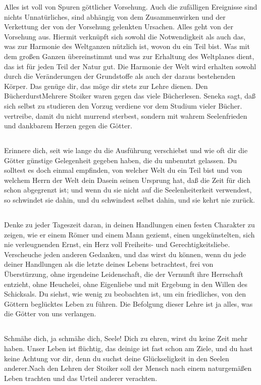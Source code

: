 \documentclass[12pt,ngerman,parskip=full]{scrartcl}
\newcounter{abschnitt}
\newcommand{\abschnitt}{\subsection*{\theabschnitt}\stepcounter{abschnitt}}
\begin{document}
Alles ist voll von Spuren göttlicher Vorsehung. Auch die zufälligen Ereignisse sind nichts Unnatürliches, sind abhängig von dem Zusammenwirken und der Verkettung der von der Vorsehung gelenkten Ursachen. Alles geht von der Vorsehung aus. Hiermit verknüpft sich sowohl die Notwendigkeit als auch das, was zur Harmonie des Weltganzen nützlich ist, wovon du ein Teil bist. Was mit dem großen Ganzen übereinstimmt und was zur Erhaltung des Weltplanes dient, das ist für jeden Teil der Natur gut. Die Harmonie der Welt wird erhalten sowohl durch die Veränderungen der Grundstoffe als auch der daraus bestehenden Körper. Das genüge dir, das möge dir stets zur Lehre dienen. Den BücherdurstMehrere Stoiker waren gegen das viele Bücherlesen. Seneka sagt, daß sich selbst zu studieren den Vorzug verdiene vor dem Studium vieler Bücher. vertreibe, damit du nicht murrend sterbest, sondern mit wahrem Seelenfrieden und dankbarem Herzen gegen die Götter.

\abschnitt

Erinnere dich, seit wie lange du die Ausführung verschiebst und wie oft dir die Götter günstige Gelegenheit gegeben haben, die du unbenutzt gelassen. Du solltest es doch einmal empfinden, von welcher Welt du ein Teil bist und von welchem Herrn der Welt dein Dasein seinen Ursprung hat, daß die Zeit für dich schon abgegrenzt ist; und wenn du sie nicht auf die Seelenheiterkeit verwendest, so schwindet sie dahin, und du schwindest selbst dahin, und sie kehrt nie zurück.

\abschnitt

Denke zu jeder Tageszeit daran, in deinen Handlungen einen festen Charakter zu zeigen, wie er einem Römer und einem Mann geziemt, einen ungekünstelten, sich nie verleugnenden Ernst, ein Herz voll Freiheits- und Gerechtigkeitsliebe. Verscheuche jeden anderen Gedanken, und das wirst du können, wenn du jede deiner Handlungen als die letzte deines Lebens betrachtest, frei von Überstürzung, ohne irgendeine Leidenschaft, die der Vernunft ihre Herrschaft entzieht, ohne Heuchelei, ohne Eigenliebe und mit Ergebung in den Willen des Schicksals. Du siehst, wie wenig zu beobachten ist, um ein friedliches, von den Göttern beglücktes Leben zu führen. Die Befolgung dieser Lehre ist ja alles, was die Götter von uns verlangen.

\abschnitt

Schmähe dich, ja schmähe dich, Seele! Dich zu ehren, wirst du keine Zeit mehr haben. Unser Leben ist flüchtig, das deinige ist fast schon am Ziele, und du hast keine Achtung vor dir, denn du suchst deine Glückseligkeit in den Seelen anderer.Nach den Lehren der Stoiker soll der Mensch nach einem naturgemäßen Leben trachten und das Urteil anderer verachten.
\end{document}
